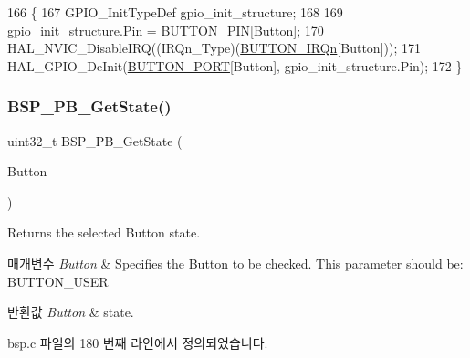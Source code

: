 \begin{DoxyCode}
166 \{
167   GPIO\_InitTypeDef gpio\_init\_structure;
168 
169   gpio\_init\_structure.Pin = \mbox{\hyperlink{bsp_8c_adf78f2d71408a01f8d30929c2d2da82b}{BUTTON\_PIN}}[Button];
170   HAL\_NVIC\_DisableIRQ((IRQn\_Type)(\mbox{\hyperlink{bsp_8c_a13c3e27c584df9fccc4697dd535ea1cd}{BUTTON\_IRQn}}[Button]));
171   HAL\_GPIO\_DeInit(\mbox{\hyperlink{bsp_8c_ad63ed42b4071e78f80f7462227da4f35}{BUTTON\_PORT}}[Button], gpio\_init\_structure.Pin);
172 \}
\end{DoxyCode}
\mbox{\label{group___s_t_m32_l1_x_x___n_u_c_l_e_o___b_u_t_t_o_n___functions_ga8f0978b6cffda9c67266ddfdb3a0abf7}} 
\subsubsection{\texorpdfstring{B\+S\+P\+\_\+\+P\+B\+\_\+\+Get\+State()}{BSP\_PB\_GetState()}}
{\footnotesize\ttfamily uint32\+\_\+t B\+S\+P\+\_\+\+P\+B\+\_\+\+Get\+State (\begin{DoxyParamCaption}\item[{\mbox{\hyperlink{_lory_s_d_k__hw__conf_8h_a643816dfbad5c734fc25a29ce8d35bb1}{Button\+\_\+\+Type\+Def}}}]{Button }\end{DoxyParamCaption})}



Returns the selected Button state. 


\begin{DoxyParams}{매개변수}
{\em Button} & Specifies the Button to be checked. This parameter should be\+: B\+U\+T\+T\+O\+N\+\_\+\+U\+S\+ER ~\newline
\\
\hline
\end{DoxyParams}

\begin{DoxyRetVals}{반환값}
{\em Button} & state. \\
\hline
\end{DoxyRetVals}


bsp.\+c 파일의 180 번째 라인에서 정의되었습니다.


